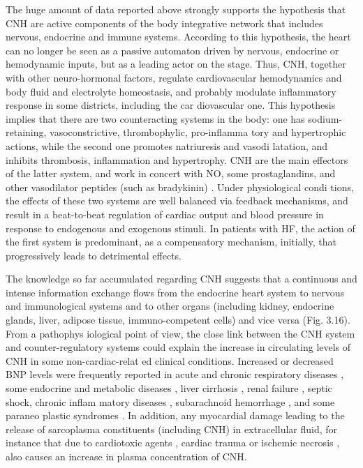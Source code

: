 \documentclass[14pt,a4paper,onecolumn]{extarticle}
\begin{document}
The huge amount of data reported above strongly supports the hypothesis that CNH are active components of the body integrative network that includes nervous, endocrine and immune systems. According to this hypothesis, the heart can no longer be seen as a passive automaton driven by nervous, endocrine or hemodynamic inputs, but as a leading actor on the stage. Thus, CNH, together with other neuro-hormonal factors, regulate cardiovascular hemodynamics and body fluid and electrolyte homeostasis, and probably modulate inflammatory response in some districts, including the car diovascular one. This hypothesis implies that there are two counteracting systems in the body: one has sodium-retaining, vasoconstrictive, thrombophylic, pro-inflamma tory and hypertrophic actions, while the second one promotes natriuresis and vasodi latation, and inhibits thrombosis, inflammation and hypertrophy. CNH are the main effectors of the latter system, and work in concert with NO, some prostaglandins, and other vasodilator peptides (such as bradykinin) \citep{116} \citep{117} \citep{118} \citep{119} \citep{120}. Under physiological condi tions, the effects of these two systems are well balanced via feedback mechanisms, and result in a beat-to-beat regulation of cardiac output and blood pressure in response to endogenous and exogenous stimuli. In patients with HF, the action of the first system is predominant, as a compensatory mechanism, initially, that progressively leads to detrimental effects.

The knowledge so far accumulated regarding CNH suggests that a continuous and intense information exchange flows from the endocrine heart system to nervous and immunological systems and to other organs (including kidney, endocrine glands, liver, adipose tissue, immuno-competent cells) and vice versa (Fig. 3.16). From a pathophys iological point of view, the close link between the CNH system and counter-regulatory systems could explain the increase in circulating levels of CNH in some non-cardiac-relat ed clinical conditions. Increased or decreased BNP levels were frequently reported in acute and chronic respiratory diseases \citep{121} \citep{122} \citep{123} \citep{124} \citep{125} \citep{126} \citep{127} \citep{128} \citep{129}, some endocrine and metabolic diseases \citep{130} \citep{131} \citep{132} \citep{133} \citep{134} \citep{135} \citep{136} \citep{137} \citep{138} \citep{139} \citep{140} \citep{141}, liver cirrhosis \citep{142} \citep{143} \citep{144}, renal failure \citep{100} \citep{144}, septic shock, chronic inflam matory diseases \citep{145} \citep{146} \citep{147} \citep{148} \citep{149}, subarachnoid hemorrhage \citep{150} \citep{151} \citep{152} \citep{153}, and some paraneo plastic syndromes \citep{154} \citep{155} \citep{156}. In addition, any myocardial damage leading to the release of sarcoplasma constituents (including CNH) in extracellular fluid, for instance that due to cardiotoxic agents \citep{157} \citep{158} \citep{159} \citep{160} \citep{161}, cardiac trauma or ischemic necrosis \citep{162} \citep{163}, also causes an increase in plasma concentration of CNH.
\end{document}
